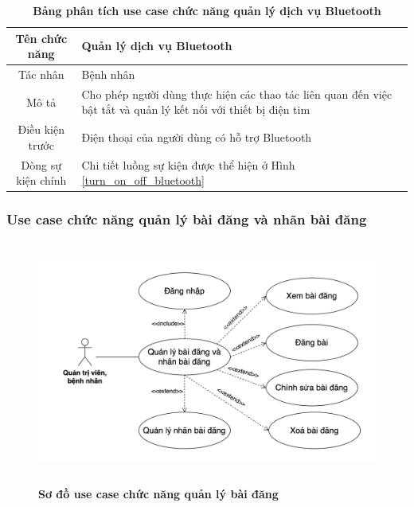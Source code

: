   \begin{table}[H]
    \caption{\bfseries \fontsize{12pt}{0pt}\selectfont Bảng phân tích use case chức năng quản lý dịch vụ Bluetooth}
    \centering
    \begin{tabularx}{0.9\textwidth}{|c|X|}
      \hline
      \textbf{Tên chức năng} & \textbf{Quản lý dịch vụ Bluetooth} \\
      \hline
      Tác nhân & Bệnh nhân \\
      \hline
      Mô tả & Cho phép người dùng thực hiện các thao tác liên quan đến việc bật tắt và quản lý kết nối với thiết bị điện tim \\
      \hline
      Điều kiện trước & Điện thoại của người dùng có hỗ trợ Bluetooth \\
      \hline
      Dòng sự kiện chính & 
        Chi tiết luồng sự kiện được thể hiện ở Hình \ref{turn_on_off_bluetooth} \\
      \hline
    \end{tabularx}
  \end{table}

\subsubsection{Use case chức năng quản lý bài đăng và nhãn bài đăng}
  \begin{figure}[H]
    \centering
    \includegraphics[width=15cm,height=8cm]{Images/use_case/use_case_news.png}
    \caption[Sơ đồ use case chức năng quản lý bài đăng]{\bfseries \fontsize{12pt}{0pt}
    \selectfont Sơ đồ use case chức năng quản lý bài đăng}
    \label{use_case_news} %
  \end{figure}

